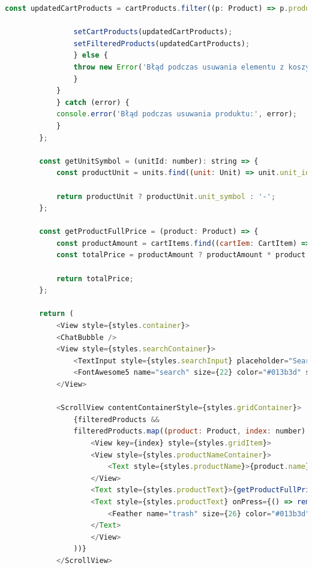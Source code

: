\begin{lstlisting}[language=JavaScript, caption=Koszyk użytkownika implementacja, label=lst:service]
                const updatedCartProducts = cartProducts.filter((p: Product) => p.product_id !== product.product_id);

                setCartProducts(updatedCartProducts);
                setFilteredProducts(updatedCartProducts);
                } else {
                throw new Error('Błąd podczas usuwania elementu z koszyka');
                }
            }
            } catch (error) {
            console.error('Błąd podczas usuwania produktu:', error);
            }
        };

        const getUnitSymbol = (unitId: number): string => {
            const productUnit = units.find((unit: Unit) => unit.unit_id === unitId);

            return productUnit ? productUnit.unit_symbol : '-';
        };

        const getProductFullPrice = (product: Product) => {
            const productAmount = cartItems.find((cartIem: CartItem) => cartIem.product_id === product.product_id)?.quantity;
            const totalPrice = productAmount ? productAmount * product.price : '-';

            return totalPrice;
        };

        return (
            <View style={styles.container}>
            <ChatBubble />
            <View style={styles.searchContainer}>
                <TextInput style={styles.searchInput} placeholder="Search products" value={searchQuery} onChangeText={handleSearch} selectionColor="#013b3d" />
                <FontAwesome5 name="search" size={22} color="#013b3d" style={styles.searchIcon} />
            </View>

            <ScrollView contentContainerStyle={styles.gridContainer}>
                {filteredProducts &&
                filteredProducts.map((product: Product, index: number) => (
                    <View key={index} style={styles.gridItem}>
                    <View style={styles.productNameContainer}>
                        <Text style={styles.productName}>{product.name}</Text>
                    </View>
                    <Text style={styles.productText}>{getProductFullPrice(product) + ' $'}</Text>
                    <Text style={styles.productText} onPress={() => removeFromCart(product)}>
                        <Feather name="trash" size={26} color="#013b3d" style={styles.searchIcon} />
                    </Text>
                    </View>
                ))}
            </ScrollView>


\end{lstlisting}
